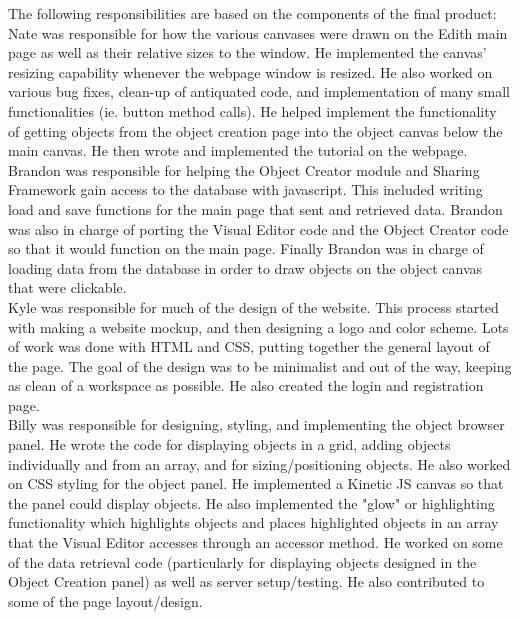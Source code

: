 \documentclass[12pt]{article}
\begin{document}
The following responsibilities are based on the components of the final product: \\

Nate was responsible for how the various canvases were drawn on the Edith main page as well as their relative sizes to the window. He implemented the canvas' resizing capability whenever the webpage window is resized. He also worked on various bug fixes, clean-up of antiquated code, and implementation of many small functionalities (ie. button method calls). He helped implement the functionality of getting objects from the object creation page into the object canvas below the main canvas. He then wrote and implemented the tutorial on the webpage. \\

Brandon was responsible for helping the Object Creator module and Sharing Framework gain access to the database with javascript.  This included writing load and save functions for the main page that sent and retrieved data.  Brandon was also in charge of porting the Visual Editor code and the Object Creator code so that it would function on the main page.  Finally Brandon was in charge of loading data from the database in order to draw objects on the object canvas that were clickable.  \\

Kyle was responsible for much of the design of the website. This process started with making a website mockup, and then designing a logo and color scheme. Lots of work was done with HTML and CSS, putting together the general layout of the page. The goal of the design was to be minimalist and out of the way, keeping as clean of a workspace as possible. He also created the login and registration page. \\


Billy was responsible for designing, styling, and implementing the object browser panel. He wrote the code for displaying objects in a grid, adding objects individually and from an array, and for sizing/positioning objects. He also worked on CSS styling for the object panel. He implemented a Kinetic JS canvas so that the panel could display objects. He also implemented the "glow" or highlighting functionality which highlights objects and places highlighted objects in an array that the Visual Editor accesses through an accessor method. He worked on some of the data retrieval code (particularly for displaying objects designed in the Object Creation panel) as well as server setup/testing. He also contributed to some of the page layout/design.
\end{document}
